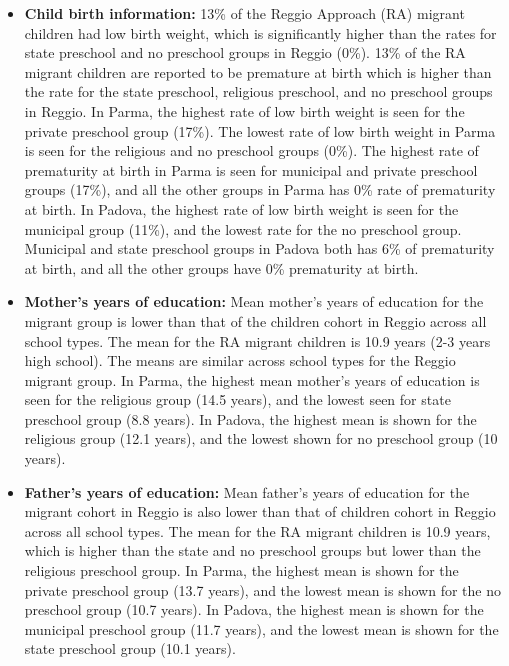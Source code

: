 \documentclass[12pt]{article}
\begin{document}
\begin{itemize}
\item \textbf{Child birth information:} 13\% of the Reggio Approach (RA) migrant children had low birth weight, which is significantly higher than the rates for state preschool and no preschool groups in Reggio (0\%). 13\% of the RA migrant children are reported to be premature at birth which is higher than the rate for the state preschool, religious preschool, and no preschool groups in Reggio. In Parma, the highest rate of low birth weight is seen for the private preschool group (17\%). The lowest rate of low birth weight in Parma is seen for the religious and no preschool groups (0\%). The highest rate of prematurity at birth in Parma is seen for municipal and private preschool groups (17\%), and all the other groups in Parma has 0\% rate of prematurity at birth. In Padova, the highest rate of low birth weight is seen for the municipal group (11\%), and the lowest rate for the no preschool group. Municipal and state preschool groups in Padova both has 6\% of prematurity at birth, and all the other groups have 0\% prematurity at birth. 

\item \textbf{Mother's years of education:} Mean mother's years of education for the migrant group is lower than that of the children cohort in Reggio across all school types. The mean for the RA migrant children is 10.9 years (2-3 years high school). The means are similar across school types for the Reggio migrant group. In Parma, the highest mean mother's years of education is seen for the religious group (14.5 years), and the lowest seen for state preschool group (8.8 years). In Padova, the highest mean is shown for the religious group (12.1 years), and the lowest shown for no preschool group (10 years). 

\item \textbf{Father's years of education:} Mean father's years of education for the migrant cohort in Reggio is also lower than that of children cohort in Reggio across all school types. The mean for the RA migrant children is 10.9 years, which is higher than the state and no preschool groups but lower than the religious preschool group. In Parma, the highest mean is shown for the private preschool group (13.7 years), and the lowest mean is shown for the no preschool group (10.7 years). In Padova, the highest mean is shown for the municipal preschool group (11.7 years), and the lowest mean is shown for the state preschool group (10.1 years).


\end{itemize}
\end{document}
